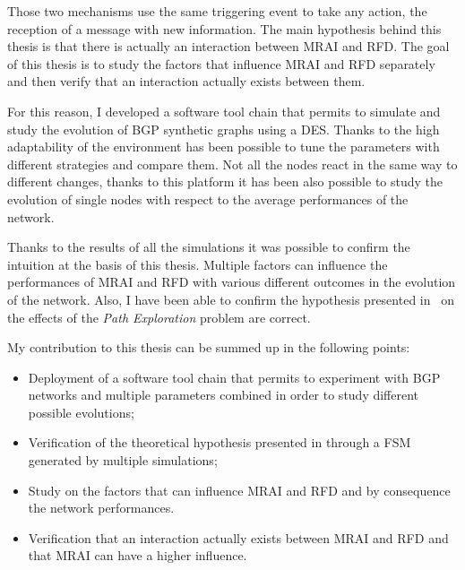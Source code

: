 Those two mechanisms use the same triggering event to take any action, the reception
of a message with new information.
The main hypothesis behind this thesis is that there is actually an interaction
between \ac{MRAI} and \ac{RFD}.
The goal of this thesis is to study the factors that influence \ac{MRAI} and
\ac{RFD} separately and then verify that an interaction actually exists between
them.

For this reason, I developed a software tool chain that permits to simulate and
study the evolution of \ac{BGP} synthetic graphs using a \ac{DES}.
Thanks to the high adaptability of the environment has been possible to tune
the parameters with different strategies and compare them.
Not all the nodes react in the same way to different changes, thanks to this
platform it has been also possible to study the evolution of single nodes
with respect to the average performances of the network.

Thanks to the results of all the simulations it was possible to confirm
the intuition at the basis of this thesis.
Multiple factors can influence the performances of \ac{MRAI} and \ac{RFD} with
various different outcomes in the evolution of the network.
Also, I have been able to confirm the hypothesis presented in~\cite{griffinFSM,fabrikant2011there}
on the effects of the \textit{Path Exploration} problem are correct.

My contribution to this thesis can be summed up in the following points:
\begin{itemize}
		\item Deployment of a software tool chain that permits to experiment
		with \ac{BGP} networks and multiple parameters combined in order to study
		different possible evolutions;
		\item Verification of the theoretical hypothesis presented in
		\cite{griffinFSM,fabrikant2011there} through a \ac{FSM} generated by
		multiple simulations;
		\item Study on the factors that can influence \ac{MRAI} and \ac{RFD} and
		by consequence the network performances.
		\item Verification that an interaction actually exists between \ac{MRAI}
		and \ac{RFD} and that \ac{MRAI} can have a higher influence.
\end{itemize}

